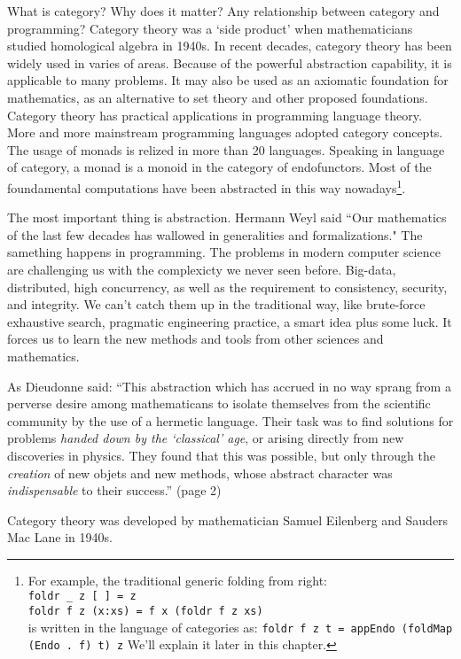 \documentclass{article}
\begin{document}
What is category? Why does it matter? Any relationship between category and programming? Category theory was a `side product' when mathematicians studied homological algebra in 1940s. In recent decades, category theory has been widely used in varies of areas. Because of the powerful abstraction capability, it is applicable to many problems. It may also be used as an axiomatic foundation for mathematics, as an alternative to set theory and other proposed foundations. Category theory has practical applications in programming language theory. More and more mainstream programming languages adopted category concepts. The usage of monads is relized in more than 20 languages\cite{Monad-Haskell-Wiki}. Speaking in language of category, a monad is a monoid in the category of endofunctors. Most of the foundamental computations have been abstracted in this way nowadays\footnote{For example, the traditional generic folding from right: \\
\texttt{foldr \_ z {[} {]} = z} \\
\texttt{foldr f z (x:xs) = f x (foldr f z xs)} \\
is written in the language of categories as: \texttt{foldr f z t = appEndo (foldMap (Endo . f) t) z} We'll explain it later in this chapter.}.

The most important thing is abstraction. Hermann Weyl said ``Our mathematics of the last few decades has wallowed in generalities and formalizations." The samething happens in programming. The problems in modern computer science are challenging us with the complexicty we never seen before. Big-data, distributed, high concurrency, as well as the requirement to consistency, security, and integrity. We can't catch them up in the traditional way, like brute-force exhaustive search, pragmatic engineering practice, a smart idea plus some luck. It forces us to learn the new methods and tools from other sciences and mathematics.

As Dieudonne said: ``This abstraction which has accrued in no way sprang from a perverse desire among mathematicans to isolate themselves from the scientific community by the use of a hermetic language. Their task was to find solutions for problems {\em handed down by the `classical' age}, or arising directly from new discoveries in physics. They found that this was possible, but only through the {\em creation} of new objets and new methods, whose abstract character was {\em indispensable} to their success.'' \cite{Dieudonne1987}(page 2)

Category theory was developed by mathematician Samuel Eilenberg and Sauders Mac Lane in 1940s.
\end{document}
